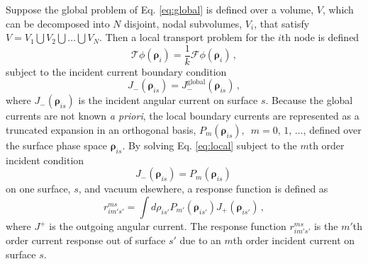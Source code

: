 \documentclass{anstrans}
\begin{document}
Suppose the global problem of Eq. \ref{eq:global} is defined over a
volume, $V$, which can be decomposed into $N$ disjoint, nodal subvolumes,
$V_i$, that satisfy $V = V_1 \bigcup V_2 \bigcup \ldots \bigcup V_N$.
Then a local transport problem for the $i$th node is defined
\begin{equation}
  \mathcal{T} \phi(\bm{\rho}_i) =
    \frac{1}{k} \mathcal{F} \phi(\bm{\rho}_i) \, ,
  \label{eq:local}
\end{equation}
subject to the incident current boundary condition
\begin{equation}
  J^{\mathrm{}}_{-} (\bm{\rho}_{is}) =
    J^{\mathrm{global}}_{-}(\bm{\rho}_{is}) \, ,
  \label{eq:localbc}
\end{equation}
where $J_{-} (\bm{\rho}_{is}) $ is the incident angular current on
surface $s$.  Because the global currents are not known
{\it a priori}, the local boundary currents are represented as a truncated
expansion in an
orthogonal basis, $P_m(\bm{\rho}_{is}), \,\,\, m = 0, \, 1, \, \ldots$,
defined over the surface phase space $\bm{\rho}_{is}$.
By solving Eq. \ref{eq:local} subject to the $m$th order
incident condition
\begin{equation}
 J^{}_{-} (\bm{\rho}_{is}) = P_m(\bm{\rho}_{is}) \,
\end{equation}
on one surface, $s$, and vacuum elsewhere,
a response function is defined as
\begin{equation}
       r^{ms}_{im's'} = \int d\rho_{is'} P_{m'}(\bm{\rho}_{is'})
        J_{+} (\bm{\rho}_{is'}) \, ,
\label{eq:responsefunction}
\end{equation}
where $J^+$ is the outgoing angular current.  The
response function $r^{ms}_{im's'}$
is the $m'$th order current response out of
surface $s'$ due to an $m$th order incident current on
surface $s$.
%
\end{document}
